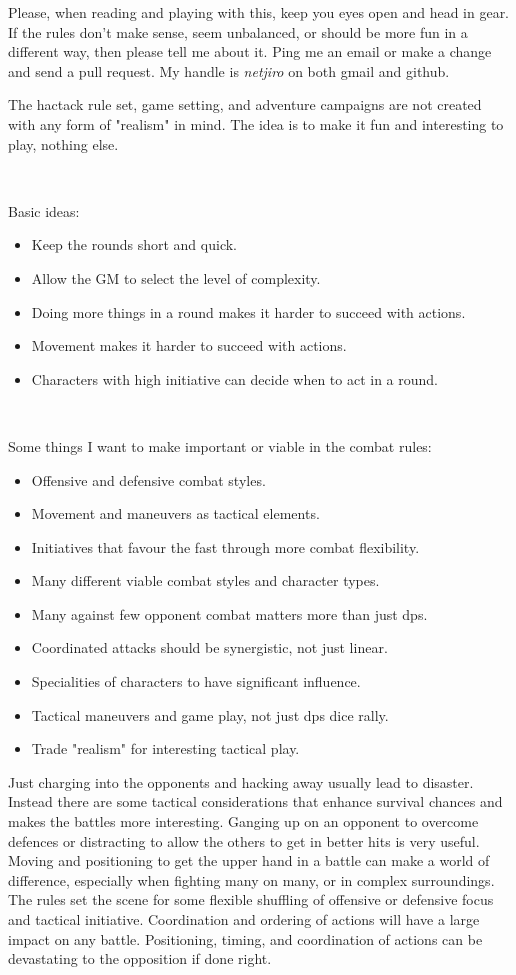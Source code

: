 Please, when reading and playing with this, keep you eyes open and head in gear. If the rules don't make sense, seem unbalanced, or should be more fun in a different way, then please tell me about it. Ping me an email or make a change and send a pull request. My handle is \emph{netjiro} on both gmail and github.

The hactack rule set, game setting, and adventure campaigns are not created with any form of "realism" in mind. The idea is to make it fun and interesting to play, nothing else.

\

Basic ideas:
\begin{itemize}
    \item Keep the rounds short and quick.
    \item Allow the GM to select the level of complexity.
    \item Doing more things in a round makes it harder to succeed with actions.
    \item Movement makes it harder to succeed with actions.
    \item Characters with high initiative can decide when to act in a round.
\end{itemize}

\

Some things I want to make important or viable in the combat rules:
\begin{itemize}
    \item Offensive and defensive combat styles.
    \item Movement and maneuvers as tactical elements.
    \item Initiatives that favour the fast through more combat flexibility.
    \item Many different viable combat styles and character types.
    \item Many against few opponent combat matters more than just dps.
    \item Coordinated attacks should be synergistic, not just linear.
    \item Specialities of characters to have significant influence.
    \item Tactical maneuvers and game play, not just dps dice rally.
    \item Trade "realism" for interesting tactical play.
\end{itemize}

Just charging into the opponents and hacking away usually lead to disaster. Instead there are some tactical considerations that enhance survival chances and makes the battles more interesting. Ganging up on an opponent to overcome defences or distracting to allow the others to get in better hits is very useful. Moving and positioning to get the upper hand in a battle can make a world of difference, especially when fighting many on many, or in complex surroundings. The rules set the scene for some flexible shuffling of offensive or defensive focus and tactical initiative. Coordination and ordering of actions will have a large impact on any battle. Positioning, timing, and coordination of actions can be devastating to the opposition if done right.

